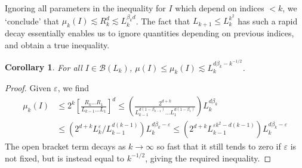 \documentclass{article}
\theoremstyle{plain}
\newtheorem{corollary}{Corollary}
\theoremstyle{plain}
\begin{document}
Ignoring all parameters in the inequality for $I$ which depend on indices $< k$, we `conclude' that $\mu_k(I) \lesssim R_k^d \lesssim L_k^{\beta_k d}$. The fact that $L_{k+1} \leq L_k^{k^2}$ has such a rapid decay essentially enables us to ignore quantities depending on previous indices, and obtain a true inequality.

\begin{corollary}
	For all $I \in \mathcal{B}(L_k)$, $\mu(I) \leq \mu_k(I) \lesssim L_k^{d \beta_k - k^{-1/2}}$.
\end{corollary}
\begin{proof}
	Given $\varepsilon$, we find
	\begin{align*}
		\mu_k(I) &\leq 2^k \left[ \frac{R_k \dots R_1}{L_{k-1} \dots L_1} \right]^d \leq \left( \frac{2^{d + k}}{L_{k-1}^{d(1 - \beta_{k-1})} \dots L_1^{d(1 - \beta_1)}} \right) L_k^{d \beta_k}\\
		&\leq \left( 2^{d + k} L_k^\varepsilon / L_{k-1}^{d(k-1)} \right) L_k^{d \beta_k - \varepsilon} \leq \left( 2^{d + k} L_{k-1}^{\varepsilon k^2 - d(k - 1)} \right) L_k^{d \beta_k - \varepsilon}
	\end{align*}
	The open bracket term decays as $k \to \infty$ so fast that it still tends to zero if $\varepsilon$ is not fixed, but is instead equal to $k^{-1/2}$, giving the required inequality.
\end{proof}


\end{document}
